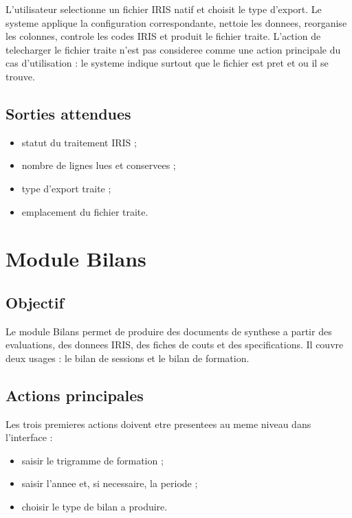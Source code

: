 \documentclass[11pt,a4paper]{report}
\begin{document}
L'utilisateur selectionne un fichier IRIS natif et choisit le type d'export. Le systeme applique la configuration correspondante, nettoie les donnees, reorganise les colonnes, controle les codes IRIS et produit le fichier traite. L'action de telecharger le fichier traite n'est pas consideree comme une action principale du cas d'utilisation : le systeme indique surtout que le fichier est pret et ou il se trouve.

\section{Sorties attendues}

\begin{itemize}
  \item statut du traitement IRIS ;
  \item nombre de lignes lues et conservees ;
  \item type d'export traite ;
  \item emplacement du fichier traite.
\end{itemize}

\chapter{Module Bilans}

\section{Objectif}

Le module Bilans permet de produire des documents de synthese a partir des evaluations, des donnees IRIS, des fiches de couts et des specifications. Il couvre deux usages : le bilan de sessions et le bilan de formation.

\section{Actions principales}

Les trois premieres actions doivent etre presentees au meme niveau dans l'interface :

\begin{itemize}
  \item saisir le trigramme de formation ;
  \item saisir l'annee et, si necessaire, la periode ;
  \item choisir le type de bilan a produire.
\end{itemize}
\end{document}
